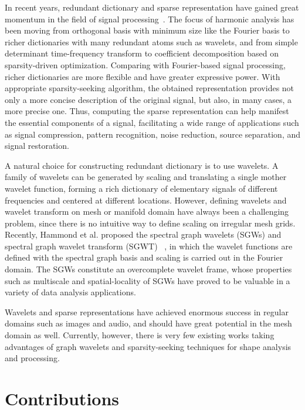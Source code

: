 In recent years, redundant dictionary and sparse representation have gained great momentum in the field of
signal processing~\cite{Mallat2008}. The focus of harmonic analysis has been moving from orthogonal basis with 
minimum size like the Fourier basis to richer dictionaries with many redundant atoms such as wavelets, 
and from simple determinant time-frequency transform to coefficient decomposition based on sparsity-driven 
optimization. Comparing with Fourier-based signal processing, richer dictionaries are more flexible and have
greater expressive power. With appropriate sparsity-seeking algorithm, the obtained representation provides
not only a more concise description of the original signal, but also, in many cases, a more precise one. 
Thus, computing the sparse representation can help manifest the essential components of a signal, facilitating 
a wide range of applications such as signal compression, pattern recognition,
noise reduction, source separation, and signal restoration.

A natural choice for constructing redundant dictionary is to use wavelets. A family
of wavelets can be generated by scaling and translating a single mother wavelet function,
forming a rich dictionary of elementary signals of different frequencies and centered
at different locations. However, defining wavelets and wavelet transform on mesh or
manifold domain have always been a challenging problem, since there is no intuitive way
to define scaling on irregular mesh grids. Recently, Hammond et al. proposed the spectral
graph wavelets (SGWs) and spectral graph wavelet transform (SGWT)~\cite{Hammond2011}
, in which the wavelet functions are defined with the spectral graph basis and scaling is carried 
out in the Fourier domain. The SGWs constitute an overcomplete wavelet frame, whose properties 
such as multiscale and spatial-locality of SGWs have proved to be valuable in a variety of data
analysis applications.

Wavelets and sparse representations have achieved enormous success in regular domains 
such as images and audio, and should have great potential in the mesh domain as well. 
Currently, however, there is very few existing works taking advantages of graph wavelets 
and sparsity-seeking techniques for shape analysis and processing.

\section{Contributions}

